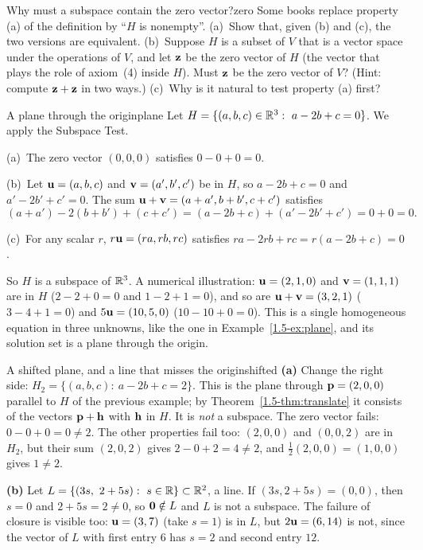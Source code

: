 \documentclass[11pt]{article}
\begin{document}
\begin{think}{Why must a subspace contain the zero vector?}{zero}
Some books replace property (a) of the definition by ``$H$ is nonempty''. (a)~Show that, given (b) and (c), the two versions are equivalent. (b)~Suppose $H$ is a subset of $V$ that is a vector space under the operations of $V$, and let $\mathbf{z}$ be the zero vector of $H$ (the vector that plays the role of axiom~(4) inside $H$). Must $\mathbf{z}$ be the zero vector of $V$? (Hint: compute $\mathbf{z}+\mathbf{z}$ in two ways.) (c)~Why is it natural to test property (a) first?
\end{think}

\begin{exmp}{A plane through the origin}{plane}
Let $H=\{(a,b,c)\in\mathbb{R}^3:\ a-2b+c=0\}$. We apply the Subspace Test.

(a)~The zero vector $(0,0,0)$ satisfies $0-0+0=0$.

(b)~Let $\mathbf{u}=(a,b,c)$ and $\mathbf{v}=(a',b',c')$ be in $H$, so $a-2b+c=0$ and $a'-2b'+c'=0$. The sum $\mathbf{u}+\mathbf{v}=(a+a',b+b',c+c')$ satisfies
\[
(a+a')-2(b+b')+(c+c')=(a-2b+c)+(a'-2b'+c')=0+0=0.
\]

(c)~For any scalar $r$, $r\mathbf{u}=(ra,rb,rc)$ satisfies $ra-2rb+rc=r(a-2b+c)=0$.

So $H$ is a subspace of $\mathbb{R}^3$. A numerical illustration: $\mathbf{u}=(2,1,0)$ and $\mathbf{v}=(1,1,1)$ are in $H$ ($2-2+0=0$ and $1-2+1=0$), and so are $\mathbf{u}+\mathbf{v}=(3,2,1)$ ($3-4+1=0$) and $5\mathbf{u}=(10,5,0)$ ($10-10+0=0$). This is a single homogeneous equation in three unknowns, like the one in Example~\ref{1.5-ex:plane}, and its solution set is a plane through the origin.
\end{exmp}

\begin{exmp}{A shifted plane, and a line that misses the origin}{shifted}
\textbf{(a)} Change the right side: $H_2=\{(a,b,c):\ a-2b+c=2\}$. This is the plane through $\mathbf{p}=(2,0,0)$ parallel to $H$ of the previous example; by Theorem~\ref{1.5-thm:translate} it consists of the vectors $\mathbf{p}+\mathbf{h}$ with $\mathbf{h}$ in $H$. It is \emph{not} a subspace. The zero vector fails: $0-0+0=0\neq2$. The other properties fail too: $(2,0,0)$ and $(0,0,2)$ are in $H_2$, but their sum $(2,0,2)$ gives $2-0+2=4\neq2$, and $\tfrac12(2,0,0)=(1,0,0)$ gives $1\neq2$.

\textbf{(b)} Let $L=\{(3s,\ 2+5s):\ s\in\R\}\subset\R^2$, a line. If $(3s,2+5s)=(0,0)$, then $s=0$ and $2+5s=2\neq0$, so $\mathbf{0}\notin L$ and $L$ is not a subspace. The failure of closure is visible too: $\mathbf{u}=(3,7)$ (take $s=1$) is in $L$, but $2\mathbf{u}=(6,14)$ is not, since the vector of $L$ with first entry $6$ has $s=2$ and second entry $12$.
\end{exmp}
\end{document}
